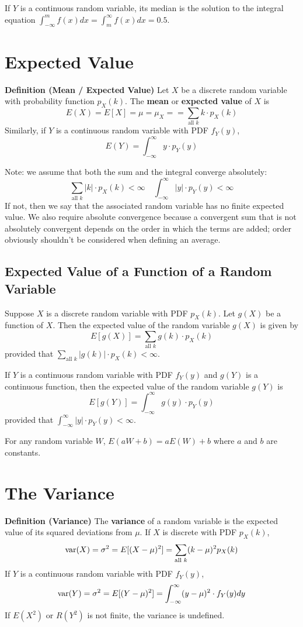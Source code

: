 If $Y$ is a continuous random variable, its median is the solution to the integral equation $\int_{-\infty}^{m} f(x)dx = \int_{m}^{\infty} f(x)dx = 0.5$.

\section{Expected Value}

\textbf{Definition (Mean / Expected Value)} Let $X$ be a discrete random variable with probability function $p_X(k)$. The \textbf{mean} or \textbf{expected value} of $X$ is $$E(X) = E[X] = \mu = \mu_X = = \sum_{\text{all } k} k \cdot p_X(k)$$ Similarly, if $Y$ is a continuous random variable with PDF $f_Y(y)$, $$ E(Y) = \int_{-\infty}^{\infty} y \cdot p_Y(y)$$

Note: we assume that both the sum and the integral converge absolutely: $$ \sum_{\text{all } k} |k| \cdot p_X(k) < \infty \quad \int_{-\infty}^{\infty} |y| \cdot p_Y(y) < \infty$$ If not, then we say that the associated random variable has no finite expected value. We also require absolute convergence because a convergent sum that is not absolutely convergent depends on the order in which the terms are added; order obviously shouldn't be considered when defining an average.

\subsection{Expected Value of a Function of a Random Variable}

Suppose $X$ is a discrete random variable with PDF $p_X(k)$. Let $g(X)$ be a function of $X$. Then the expected value of the random variable $g(X)$ is given by $$E[g(X)] = \sum_{\text{all } k} g(k) \cdot p_X(k)$$ provided that $\sum_{\text{all } k} |g(k)| \cdot p_X(k) < \infty $.

If $Y$ is a continuous random variable with PDF $f_Y(y)$ and $g(Y)$ is a continuous function, then the expected value of the random variable $g(Y)$ is $$E[g(Y)] = \int_{-\infty}^{\infty} g(y) \cdot p_Y(y)$$ provided that $\int_{-\infty}^{\infty} |y| \cdot p_Y(y) < \infty$.

For any random variable $W$, $E(aW + b) = aE(W) + b$ where $a$ and $b$ are constants.

\section{The Variance}

\textbf{Definition (Variance)} The \textbf{variance} of a random variable is the expected value of its squared deviations from $\mu$. If $X$ is discrete with PDF $p_X(k)$, $$\operatorname{var}(X) = \sigma^2 = E[(X-\mu)^2] = \sum_{\text{all } k} (k-\mu)^2 p_X(k)$$ If $Y$ is a continuous random variable with PDF $f_Y(y)$, $$\operatorname{var}(Y) = \sigma^2 = E[(Y - \mu)^2] = \int_{-\infty}^{\infty} (y-\mu)^2 \cdot f_Y(y) dy$$ If $E(X^2)$ or $R(Y^2)$ is not finite, the variance is undefined.

